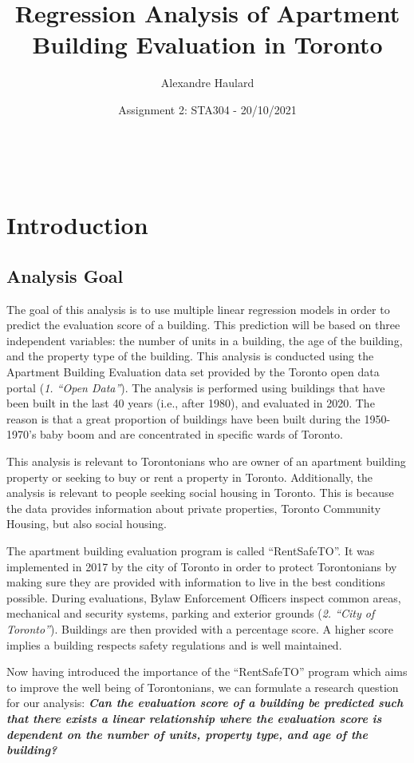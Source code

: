 \documentclass[
]{article}
\title{Regression Analysis of Apartment Building Evaluation in Toronto}
\author{Alexandre Haulard}
\date{Assignment 2: STA304 - 20/10/2021}
\begin{document}
\maketitle

~ ~ ~

\hypertarget{introduction}{%
\section{Introduction}\label{introduction}}

\hypertarget{analysis-goal}{%
\subsection{Analysis Goal}\label{analysis-goal}}

The goal of this analysis is to use multiple linear regression models in
order to predict the evaluation score of a building. This prediction
will be based on three independent variables: the number of units in a
building, the age of the building, and the property type of the
building. This analysis is conducted using the Apartment Building
Evaluation data set provided by the Toronto open data portal (\emph{1.
``Open Data''}). The analysis is performed using buildings that have
been built in the last 40 years (i.e., after 1980), and evaluated in
2020. The reason is that a great proportion of buildings have been built
during the 1950-1970's baby boom and are concentrated in specific wards
of Toronto.

This analysis is relevant to Torontonians who are owner of an apartment
building property or seeking to buy or rent a property in Toronto.
Additionally, the analysis is relevant to people seeking social housing
in Toronto. This is because the data provides information about private
properties, Toronto Community Housing, but also social housing.

The apartment building evaluation program is called ``RentSafeTO''. It
was implemented in 2017 by the city of Toronto in order to protect
Torontonians by making sure they are provided with information to live
in the best conditions possible. During evaluations, Bylaw Enforcement
Officers inspect common areas, mechanical and security systems, parking
and exterior grounds (\emph{2. ``City of Toronto''}). Buildings are then
provided with a percentage score. A higher score implies a building
respects safety regulations and is well maintained.

Now having introduced the importance of the ``RentSafeTO'' program which
aims to improve the well being of Torontonians, we can formulate a
research question for our analysis: \emph{\textbf{Can the evaluation
score of a building be predicted such that there exists a linear
relationship where the evaluation score is dependent on the number of
units, property type, and age of the building?}}
\end{document}
